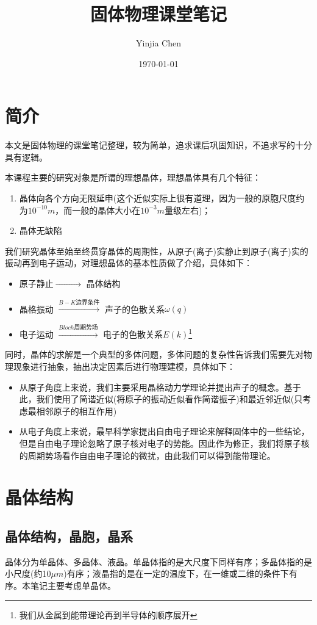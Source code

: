 \documentclass{ctexart}
\title{固体物理课堂笔记}
\author{Yinjia Chen }
\date{\today}
\begin{document}
\maketitle
\tableofcontents
\newpage
\section{简介}
本文是固体物理的课堂笔记整理，较为简单，追求课后巩固知识，不追求写的十分具有逻辑。

本课程主要的研究对象是所谓的理想晶体，理想晶体具有几个特征：
\begin{enumerate}
    \item 晶体向各个方向无限延申(这个近似实际上很有道理，因为一般的原胞尺度约为$10^{-10}m$，而一般的晶体大小在$10^{-3}m$量级左右)；
    \item 晶体无缺陷
\end{enumerate}

我们研究晶体至始至终贯穿晶体的周期性，从原子(离子)实静止到原子(离子)实的振动再到电子运动，对理想晶体的基本性质做了介绍，具体如下：
\begin{itemize}
    \item 原子静止$\xrightarrow{\quad\quad\quad\quad\ }$ 晶体结构
    \item 晶格振动 $\xrightarrow{B-K\text{边界条件}}$ 声子的色散关系$\omega(q)$
    \item 电子运动 $\xrightarrow{Bloch\text{周期势场}}$ 电子的色散关系$E(k)$\footnote{我们从金属到能带理论再到半导体的顺序展开}
\end{itemize}

同时，晶体的求解是一个典型的多体问题，多体问题的复杂性告诉我们需要先对物理现象进行抽象，抽出决定因素后进行物理建模，具体如下：
\begin{itemize}
    \item 从原子角度上来说，我们主要采用晶格动力学理论并提出声子的概念。基于此，我们使用了简谐近似(将原子的振动近似看作简谐振子)和最近邻近似(只考虑最相邻原子的相互作用)
    \item 从电子角度上来说，最早科学家提出自由电子理论来解释固体中的一些结论，但是自由电子理论忽略了原子核对电子的势能。因此作为修正，我们将原子核的周期势场看作自由电子理论的微扰，由此我们可以得到能带理论。
\end{itemize}


\section{晶体结构}
    \subsection{晶体结构，晶胞，晶系}
晶体分为单晶体、多晶体、液晶。单晶体指的是大尺度下同样有序；多晶体指的是小尺度(约10$\mu m$)有序；液晶指的是在一定的温度下，在一维或二维的条件下有序。本笔记主要考虑单晶体。
\end{document}
